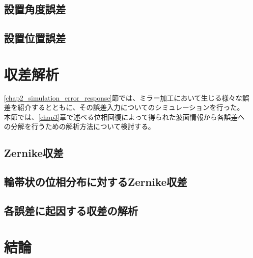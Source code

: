 \subsection{設置角度誤差}

\subsection{設置位置誤差}


\clearpage
\newpage


\clearpage
\newpage
\section{収差解析}
\label{chap2_simulation_zernike_analysis}

\ref{chap2_simulation_error_response}節では、ミラー加工において生じる様々な誤差を紹介するとともに、その誤差入力についてのシミュレーションを行った。
本節では、\ref{chap3}章で述べる位相回復によって得られた波面情報から各誤差への分解を行うための解析方法について検討する。

\subsection{Zernike収差}

\subsection{輪帯状の位相分布に対するZernike収差}


\subsection{各誤差に起因する収差の解析}



\section{結論}
\label{chap2_conclusion}




